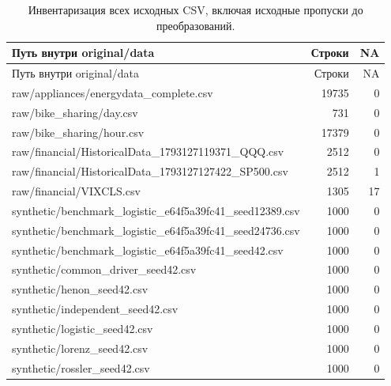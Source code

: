 \begin{longtable}{p{11cm}rr}
\caption{Инвентаризация всех исходных CSV, включая исходные пропуски до преобразований.}\label{tab:inventory}\\
\toprule
Путь внутри original/data & Строки & NA \\
\midrule
\endfirsthead
\toprule
Путь внутри original/data & Строки & NA \\
\midrule
\endhead
raw/appliances/energydata\_complete.csv & 19735 & 0 \\
raw/bike\_sharing/day.csv & 731 & 0 \\
raw/bike\_sharing/hour.csv & 17379 & 0 \\
raw/financial/HistoricalData\_1793127119371\_QQQ.csv & 2512 & 0 \\
raw/financial/HistoricalData\_1793127127422\_SP500.csv & 2512 & 1 \\
raw/financial/VIXCLS.csv & 1305 & 17 \\
synthetic/benchmark\_logistic\_e64f5a39fc41\_seed12389.csv & 1000 & 0 \\
synthetic/benchmark\_logistic\_e64f5a39fc41\_seed24736.csv & 1000 & 0 \\
synthetic/benchmark\_logistic\_e64f5a39fc41\_seed42.csv & 1000 & 0 \\
synthetic/common\_driver\_seed42.csv & 1000 & 0 \\
synthetic/henon\_seed42.csv & 1000 & 0 \\
synthetic/independent\_seed42.csv & 1000 & 0 \\
synthetic/logistic\_seed42.csv & 1000 & 0 \\
synthetic/lorenz\_seed42.csv & 1000 & 0 \\
synthetic/rossler\_seed42.csv & 1000 & 0 \\
\bottomrule
\end{longtable}
